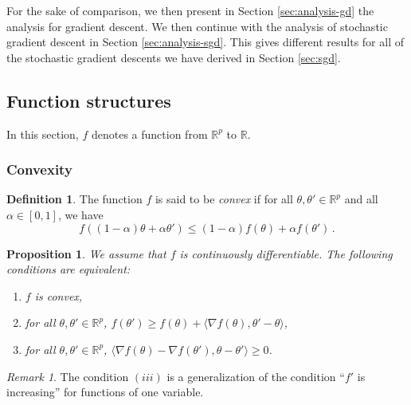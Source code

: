 \documentclass[11pt,reqno]{article}
\newcommand{\R}{\mathbb{R}}
\renewcommand{\leq}{\leqslant}
\renewcommand{\geq}{\geqslant}
\numberwithin{equation}{section}
\theoremstyle{plain}
\newtheorem{proposition}[assumption]{Proposition}
\theoremstyle{definition}
\newtheorem{definition}[assumption]{Definition}
\theoremstyle{remark}
\newtheorem{remark}[assumption]{Remark}
\begin{document}
For the sake of comparison, we then present in Section \ref{sec:analysis-gd} the analysis for gradient descent. We then continue with the analysis of stochastic gradient descent in Section \ref{sec:analysis-sgd}. This gives different results for all of the stochastic gradient descents we have derived in Section \ref{sec:sgd}.


\subsection{Function structures}
\label{sec:function-structures}

In this section, $f$ denotes a function from $\R^p$ to $\R$.

\subsubsection{Convexity}

\begin{definition}
	The function $f$ is said to be \emph{convex} if for all $\theta, \theta' \in \R^p$ and all $\alpha \in [0,1]$, we have
	\begin{equation*}
		f((1-\alpha) \theta + \alpha \theta') \leq (1-\alpha) f(\theta) + \alpha f(\theta') \, .
	\end{equation*}
\end{definition}

\begin{proposition}
	\label{prop:convex-diff}
	We assume that $f$ is continuously differentiable. The following conditions are equivalent:
	\begin{enumerate}[label=(\roman*)]
		\item $f$ is convex,
		\item for all $\theta, \theta' \in \R^p$,
		$f(\theta') \geq f(\theta) + \langle \nabla f(\theta),  \theta' - \theta \rangle$,
		\item for all $\theta, \theta' \in \R^p$, $\langle \nabla f(\theta) - \nabla f(\theta'), \theta - \theta' \rangle \geq 0$.
	\end{enumerate}
\end{proposition}

\begin{remark}
	The condition $(iii)$ is a generalization of the condition ``$f'$ is increasing'' for functions of one variable.
\end{remark}
\end{document}
